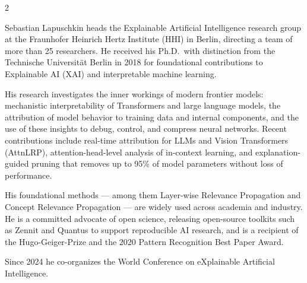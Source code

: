
\vspace{-1.3em} %

\begin{multicols}{2}  %
\noindent

Sebastian Lapuschkin heads the Explainable Artificial Intelligence research group at the Fraunhofer Heinrich Hertz Institute (HHI) in Berlin, directing a team of more than 25 researchers. He received his Ph.D.\ with distinction from the Technische Universität Berlin in 2018 for foundational contributions to Explainable AI (XAI) and interpretable machine learning.

His research investigates the inner workings of modern frontier models: mechanistic interpretability of Transformers and large language models, the attribution of model behavior to training data and internal components, and the use of these insights to debug, control, and compress neural networks. Recent contributions include real-time attribution for LLMs and Vision Transformers (AttnLRP), attention-head-level analysis of in-context learning, and explanation-guided pruning that removes up to 95\% of model parameters without loss of performance.

His foundational methods --- among them Layer-wise Relevance Propagation and Concept Relevance Propagation --- are widely used across academia and industry. He is a committed advocate of open science, releasing open-source toolkits such as Zennit and Quantus to support reproducible AI research, and is a recipient of the Hugo-Geiger-Prize and the 2020 Pattern Recognition Best Paper Award.

Since 2024 he co-organizes the World Conference on eXplainable Artificial Intelligence.


\end{multicols}
